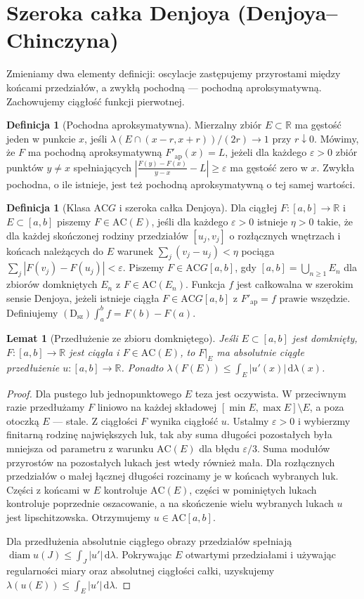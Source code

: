 \documentclass[11pt,a4paper]{article}
\numberwithin{equation}{section}
\theoremstyle{plain}
\newtheorem{lemat}[twierdzenie]{Lemat}
\theoremstyle{definition}
\newtheorem{definicja}[twierdzenie]{Definicja}
\theoremstyle{remark}
\newcommand{\R}{\mathbb R}
\newcommand{\AC}{\mathrm{AC}}
\begin{document}
\section{Szeroka całka Denjoya (Denjoya--Chinczyna)}
Zmieniamy dwa elementy definicji: oscylacje zastępujemy przyrostami między końcami przedziałów, a zwykłą pochodną --- pochodną aproksymatywną. Zachowujemy ciągłość funkcji pierwotnej.
\begin{definicja}[Pochodna aproksymatywna]
Mierzalny zbiór $E\subset\R$ ma gęstość jeden w punkcie $x$, jeśli $\lambda(E\cap(x-r,x+r))/(2r)\to1$ przy $r\downarrow0$. Mówimy, że $F$ ma pochodną aproksymatywną $F'_{\mathrm{ap}}(x)=L$, jeżeli dla każdego $\varepsilon>0$ zbiór punktów $y\ne x$ spełniających
$\left|\frac{F(y)-F(x)}{y-x}-L\right|\ge\varepsilon$ ma gęstość zero w $x$. Zwykła pochodna, o ile istnieje, jest też pochodną aproksymatywną o tej samej wartości.
\end{definicja}
\begin{definicja}[Klasa $\AC G$ i szeroka całka Denjoya]
Dla ciągłej $F:[a,b]\to\R$ i $E\subset[a,b]$ piszemy $F\in\AC(E)$, jeśli dla każdego $\varepsilon>0$ istnieje $\eta>0$ takie, że dla każdej skończonej rodziny przedziałów $[u_j,v_j]$ o rozłącznych wnętrzach i końcach należących do $E$ warunek $\sum_j(v_j-u_j)<\eta$ pociąga $\sum_j|F(v_j)-F(u_j)|<\varepsilon$. Piszemy $F\in\AC G[a,b]$, gdy $[a,b]=\bigcup_{n\ge1}E_n$ dla zbiorów domkniętych $E_n$ z $F\in\AC(E_n)$. Funkcja $f$ jest całkowalna w szerokim sensie Denjoya, jeżeli istnieje ciągła $F\in\AC G[a,b]$ z $F'_{\mathrm{ap}}=f$ prawie wszędzie. Definiujemy $ (\mathrm D_{\mathrm{sz}})\int_a^b f=F(b)-F(a)$.
\end{definicja}
\begin{lemat}[Przedłużenie ze zbioru domkniętego]
Jeśli $E\subset[a,b]$ jest domknięty, $F:[a,b]\to\R$ jest ciągła i $F\in\AC(E)$, to $F|_E$ ma absolutnie ciągłe przedłużenie $u:[a,b]\to\R$. Ponadto $\lambda(F(E))\le\int_E|u'(x)|\,\mathrm d\lambda(x)$.
\end{lemat}
\begin{proof}
Dla pustego lub jednopunktowego $E$ teza jest oczywista. W przeciwnym razie przedłużamy $F$ liniowo na każdej składowej $[\min E,\max E]\setminus E$, a poza otoczką $E$ --- stale. Z ciągłości $F$ wynika ciągłość $u$. Ustalmy $\varepsilon>0$ i wybierzmy finitarną rodzinę największych luk, tak aby suma długości pozostałych była mniejsza od parametru z warunku $\AC(E)$ dla błędu $\varepsilon/3$. Suma modułów przyrostów na pozostałych lukach jest wtedy również mała. Dla rozłącznych przedziałów o małej łącznej długości rozcinamy je w końcach wybranych luk. Części z końcami w $E$ kontroluje $\AC(E)$, części w pominiętych lukach kontroluje poprzednie oszacowanie, a na skończenie wielu wybranych lukach $u$ jest lipschitzowska. Otrzymujemy $u\in\AC[a,b]$.

Dla przedłużenia absolutnie ciągłego obrazy przedziałów spełniają $\operatorname{diam}u(J)\le\int_J|u'|\,\mathrm d\lambda$. Pokrywając $E$ otwartymi przedziałami i używając regularności miary oraz absolutnej ciągłości całki, uzyskujemy $\lambda(u(E))\le\int_E|u'|\,\mathrm d\lambda$.
\end{proof}
\end{document}
